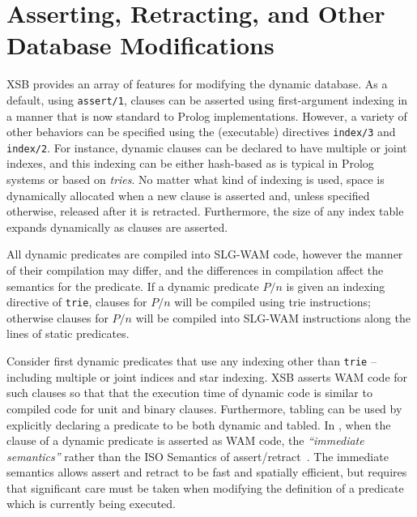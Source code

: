 
\section{Asserting, Retracting, and Other Database Modifications} \label{sec:assert}

XSB provides an array of features for modifying the dynamic database.
As a default, using {\tt assert/1}, clauses can be asserted using
first-argument indexing in a manner that is now standard to Prolog
implementations.  However, a variety of other behaviors can be
specified using the (executable) directives {\tt index/3} and {\tt
  index/2}.  For instance, dynamic clauses can be declared to have
multiple or joint indexes, and this indexing can be either hash-based
as is typical in Prolog systems or based on {\em tries}.  No matter
what kind of indexing is used, space is dynamically allocated when a
new clause is asserted and, unless specified otherwise, released after
it is retracted.  Furthermore, the size of any index table expands
dynamically as clauses are asserted.

All dynamic predicates are compiled into SLG-WAM code, however the
manner of their compilation may differ, and the differences in
compilation affect the semantics for the predicate.  If a dynamic
predicate $P/n$ is given an indexing directive of {\tt trie}, clauses
for $P/n$ will be compiled using trie instructions; otherwise clauses
for $P/n$ will be compiled into SLG-WAM instructions along the lines
of static predicates. 

Consider first dynamic predicates that use any indexing other than
{\tt trie} -- including multiple or joint indices and star indexing.
XSB asserts WAM code for such clauses so that that the execution time
of dynamic code is similar to compiled code for unit and binary
clauses.  Furthermore, tabling can be used by explicitly declaring a
predicate to be both dynamic and tabled.  In \version{}, when the
clause of a dynamic predicate is asserted as WAM code, the {\em
  ``immediate semantics''} rather than the ISO Semantics of
assert/retract~\cite{LiOk87}.  The immediate semantics allows assert
and retract to be fast and spatially efficient, but requires that
significant care must be taken when modifying the definition of a
predicate which is currently being executed.


